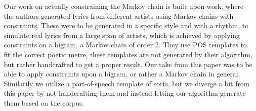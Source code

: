 \documentclass[a4paper,12pt]{article}
\begin{document}
Our work on actually constraining the Markov chain is built upon \cite{McBarb} work, 
where the authors generated lyrics from different artists using Markov chains with constraints. 
These were to be generated in a specific style and with a rhythm, to simulate real lyrics from a large span of artists, which is achieved by applying constraints on a bigram, a Markov chain of order 2.
They use POS templates to fit the correct poetic metre, these templates are not generated by their algorithm, but rather handcrafted to get a proper result.
Our take from this paper was to be able to apply constraints upon a bigram, or rather a Markov chain in general. Similarily we utilize a part-of-speech template of sorts, but we diverge a bit from this paper by not handcrafting them and instead letting our algorithm generate them based on the corpus.


\newpage

\end{document}

